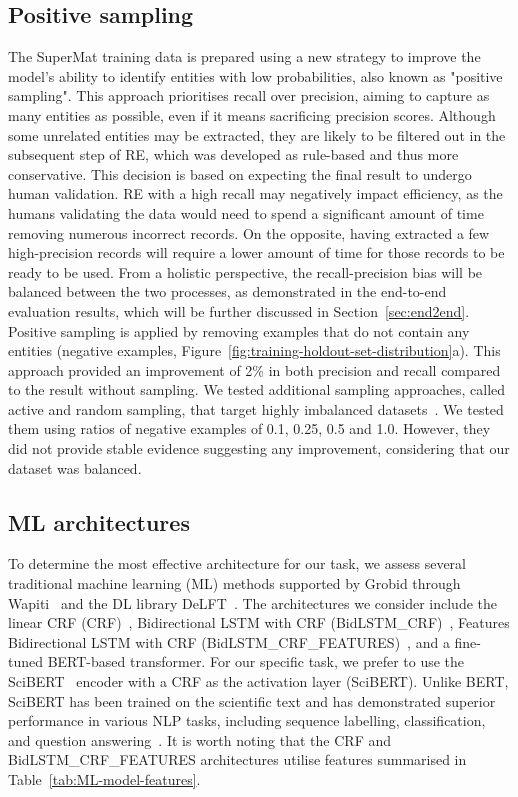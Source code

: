 \subsection{Positive sampling}
The SuperMat training data is prepared using a new strategy to improve the model's ability to identify entities with low probabilities, also known as "positive sampling". 
This approach prioritises recall over precision, aiming to capture as many entities as possible, even if it means sacrificing precision scores. 
Although some unrelated entities may be extracted, they are likely to be filtered out in the subsequent step of RE, which was developed as rule-based and thus more conservative. 
This decision is based on expecting the final result to undergo human validation. RE with a high recall may negatively impact efficiency, as the humans validating the data would need to spend a significant amount of time removing numerous incorrect records. On the opposite, having extracted a few high-precision records will require a lower amount of time for those records to be ready to be used.
From a holistic perspective, the recall-precision bias will be balanced between the two processes, as demonstrated in the end-to-end evaluation results, which will be further discussed in Section~\ref{sec:end2end}.
Positive sampling is applied by removing examples that do not contain any entities (negative examples, Figure~\ref{fig:training-holdout-set-distribution}a).
This approach provided an improvement of 2\% in both precision and recall compared to the result without sampling.
We tested additional sampling approaches, called active and random sampling, that target highly imbalanced datasets~\cite{lopez2021mining}. 
We tested them using ratios of negative examples of 0.1, 0.25, 0.5 and 1.0. However, they did not provide stable evidence suggesting any improvement, considering that our dataset was balanced. 

\subsection{ML architectures}
To determine the most effective architecture for our task, we assess several traditional machine learning (ML) methods supported by Grobid through Wapiti~\cite{lavergne2010practical} and the DL library DeLFT~\cite{delft}.
The architectures we consider include the linear CRF (CRF)~\cite{lafferty2001conditional}, Bidirectional LSTM with CRF (BidLSTM\_CRF)~\cite{lample2016neural}, Features Bidirectional LSTM with CRF (BidLSTM\_CRF\_FEATURES)~\cite{lample2016neural}, and a fine-tuned BERT-based transformer. For our specific task, we prefer to use the SciBERT~\cite{Beltagy2019SciBERT} encoder with a CRF as the activation layer (SciBERT). Unlike BERT, SciBERT has been trained on the scientific text and has demonstrated superior performance in various NLP tasks, including sequence labelling, classification, and question answering~\cite{Beltagy2019SciBERT}. It is worth noting that the CRF and BidLSTM\_CRF\_FEATURES architectures utilise features summarised in Table~\ref{tab:ML-model-features}.


